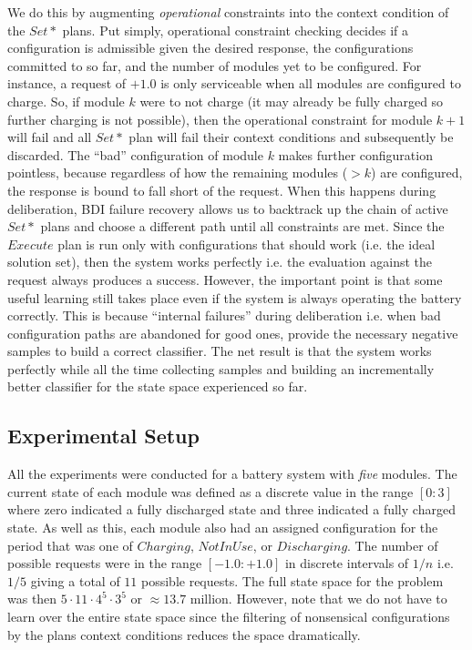 We do this by augmenting {\em operational} constraints into the context condition of the $Set*$ plans. Put simply, operational constraint checking decides if a configuration is admissible given the desired response, the configurations committed to so far, and the number of modules yet to be configured. For instance, a request of $+1.0$ is only serviceable when all modules are configured to charge. So, if module $k$ were to not charge (it may already be fully charged so further charging is not possible), then the operational constraint for module $k+1$ will fail and all $Set*$ plan will fail their context conditions and subsequently be discarded. The ``bad'' configuration of module $k$ makes further configuration pointless, because regardless of how the remaining modules ($>k$) are configured, the response is bound to fall short of the request. When this happens during deliberation, BDI failure recovery allows us to backtrack up the chain of active $Set*$ plans and choose a different path until all constraints are met. Since the $Execute$ plan is run only with configurations that should work (i.e. the ideal solution set), then the system works perfectly i.e. the evaluation against the request always produces a success. However, the important point is that some useful learning still takes place even if the system is always operating the battery correctly. This is because ``internal failures'' during deliberation i.e. when bad configuration paths are abandoned for good ones, provide the necessary negative samples to build a correct classifier. The net result is that the system works perfectly while all the time collecting samples and building an incrementally better classifier for the state space experienced so far. 





\subsection{Experimental Setup}\label{subsec:setup}

All the experiments were conducted for a battery system with {\em five} modules. The current state of each module was defined as a discrete value in the range $[0:3]$ where zero indicated a fully discharged state and three indicated a fully charged state. As well as this, each module also had an assigned configuration for the period that was one of $Charging$, $NotInUse$, or $Discharging$. The number of possible requests were in the range $[-1.0:+1.0]$ in discrete intervals of $1/n$ i.e. $1/5$ giving a total of $11$ possible requests. The full state space for the problem was then $5 \cdot 11 \cdot 4^5 \cdot 3^5$ or $\approx 13.7$ million. However, note that we do not have to learn over the entire state space since the filtering of nonsensical configurations by the plans context conditions reduces the space dramatically.

